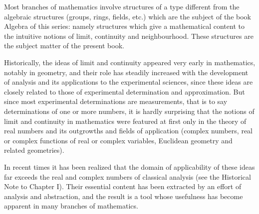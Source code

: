 
Most branches of mathematics involve structures of a type different from the algebraic structures (groups, rings, fields, etc.) which are the subject of the book Algebra of this series: namely structures which give a mathematical content to the intuitive notions of limit, continuity and neighbourhood. These structures are the subject matter of the present book.

Historically, the ideas of limit and continuity appeared very early in mathematics, notably in geometry, and their role has steadily increased with the development of analysis and its applications to the experimental sciences, since these ideas are closely related to those of experimental determination and approximation. But since most experimental determinations are measurements, that is to say determinations of one or more numbers, it is hardly surprising that the notions of limit and continuity in mathematics were featured at first only in the theory of real numbers and its outgrowths and fields of application (complex numbers, real or complex functions of real or complex variables, Euclidean geometry and related geometries).

In recent times it has been realized that the domain of applicability of these ideas far exceeds the real and complex numbers of classical analysis (see the Historical Note to Chapter I). Their essential content has been extracted by an effort of analysis and abstraction, and the result is a tool whose usefulness has become apparent in many branches of mathematics.

